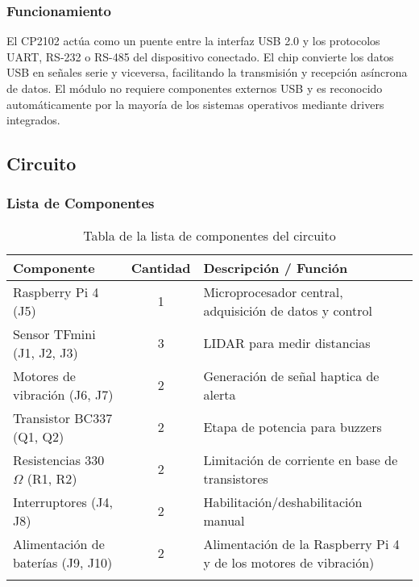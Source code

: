 \documentclass[12pt,a4paper]{article}
\begin{document}
\subsubsection{Funcionamiento}
El CP2102 actúa como un puente entre la interfaz USB 2.0 y los protocolos UART, RS-232 o RS-485 del dispositivo conectado.  
El chip convierte los datos USB en señales serie y viceversa, facilitando la transmisión y recepción asíncrona de datos.  
El módulo no requiere componentes externos USB y es reconocido automáticamente por la mayoría de los sistemas operativos mediante drivers integrados.

\subsection{Circuito}

\subsubsection{Lista de Componentes}
\begin{longtable}{|>{\raggedright}p{4cm}|c|>{\raggedright\arraybackslash}p{8cm}|}
\hline
\textbf{Componente} & \textbf{Cantidad} & \textbf{Descripción / Función} \\
\hline
Raspberry Pi 4 (J5) & 1 & Microprocesador central, adquisición de datos y control \\
\hline
Sensor TFmini (J1, J2, J3) & 3 & LIDAR para medir distancias \\
\hline
Motores de vibración (J6, J7) & 2 & Generación de señal haptica de alerta \\
\hline
Transistor BC337 (Q1, Q2) & 2 & Etapa de potencia para buzzers \\
\hline
Resistencias 330 $\Omega$ (R1, R2) & 2 & Limitación de corriente en base de transistores \\
\hline
Interruptores (J4, J8) & 2 & Habilitación/deshabilitación manual \\
\hline
Alimentación de baterías (J9, J10) & 2 & Alimentación de la Raspberry Pi 4 y de los motores de vibración)\\
\hline
\caption{Tabla de la lista de componentes del circuito}
\end{longtable}

\end{document}
